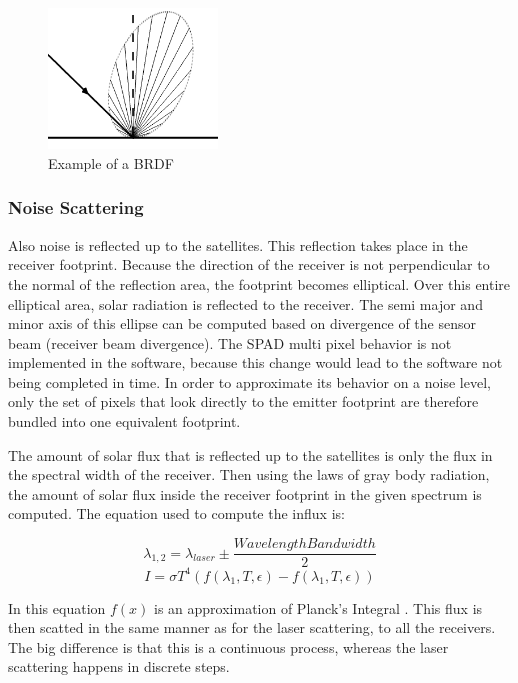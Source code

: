 \begin{figure}[ht!]
\centering
\includegraphics[width=0.4\textwidth]{chapters/img/scatter.png}
\caption{Example of a \ac{BRDF}}
\label{fig:scatter}
\end{figure}

\subsubsection{Noise Scattering}
Also noise is reflected up to the satellites. This reflection takes place in the receiver footprint. Because the direction of the receiver is not perpendicular to the normal of the reflection area, the footprint becomes elliptical. Over this entire elliptical area, solar radiation is reflected to the receiver. The semi major and minor axis of this ellipse can be computed based on divergence of the sensor beam (receiver beam divergence). The \ac{SPAD} multi pixel behavior is not implemented in the software, because this change would lead to the software not being completed in time. In order to approximate its behavior on a noise level, only the set of pixels that look directly to the emitter footprint are therefore bundled into one equivalent footprint. 

The amount of solar flux that is reflected up to the satellites is only the flux in the spectral width of the receiver. Then using the laws of gray body radiation, the amount of solar flux inside the receiver footprint in the given spectrum is computed. The equation used to compute the influx is:

\begin{equation}
	\lambda_{1,2} = \lambda _{laser} \pm \frac{Wavelength Bandwidth}{2}
\end{equation}
\begin{equation}
	I = \sigma T^4 (f(\lambda _1, T, \epsilon) - f(\lambda _1, T, \epsilon))
\end{equation}

In this equation $f(x)$ is an approximation of Planck's Integral \cite[p.~26]{rees}. This flux is then scatted in the same manner as for the laser scattering, to all the receivers. The big difference is that this is a continuous process, whereas the laser scattering happens in discrete steps.

